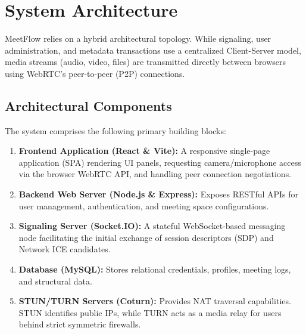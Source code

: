 \documentclass[11pt,a4paper]{article}
\begin{document}
\section{System Architecture}

MeetFlow relies on a hybrid architectural topology. While signaling, user administration, and metadata transactions use a centralized Client-Server model, media streams (audio, video, files) are transmitted directly between browsers using WebRTC's peer-to-peer (P2P) connections.

\subsection{Architectural Components}
The system comprises the following primary building blocks:
\begin{enumerate}
    \item \textbf{Frontend Application (React \& Vite):} A responsive single-page application (SPA) rendering UI panels, requesting camera/microphone access via the browser WebRTC API, and handling peer connection negotiations.
    \item \textbf{Backend Web Server (Node.js \& Express):} Exposes RESTful APIs for user management, authentication, and meeting space configurations.
    \item \textbf{Signaling Server (Socket.IO):} A stateful WebSocket-based messaging node facilitating the initial exchange of session descriptors (SDP) and Network ICE candidates.
    \item \textbf{Database (MySQL):} Stores relational credentials, profiles, meeting logs, and structural data.
    \item \textbf{STUN/TURN Servers (Coturn):} Provides NAT traversal capabilities. STUN identifies public IPs, while TURN acts as a media relay for users behind strict symmetric firewalls.
\end{enumerate}
\end{document}
